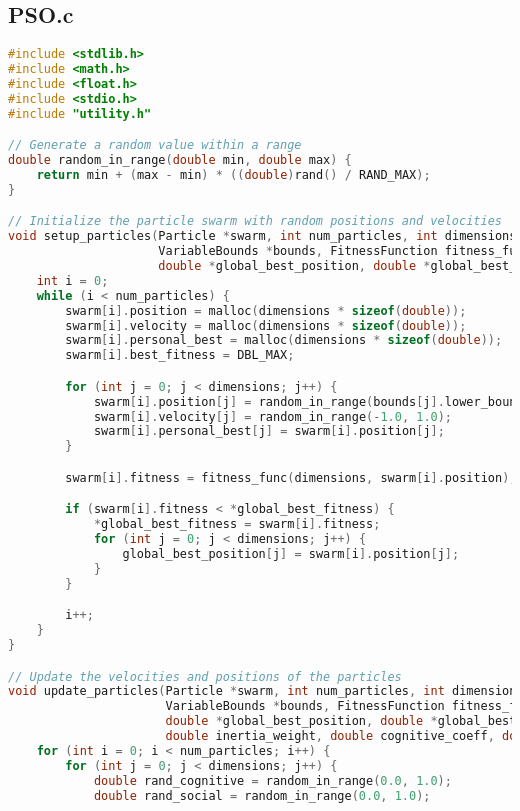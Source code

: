 \documentclass[12pt]{article}
\begin{document}
\subsection{PSO.c}
\begin{lstlisting}[language=C]
#include <stdlib.h>
#include <math.h>
#include <float.h>
#include <stdio.h>
#include "utility.h"

// Generate a random value within a range
double random_in_range(double min, double max) {
    return min + (max - min) * ((double)rand() / RAND_MAX);
}

// Initialize the particle swarm with random positions and velocities
void setup_particles(Particle *swarm, int num_particles, int dimensions,
                     VariableBounds *bounds, FitnessFunction fitness_func,
                     double *global_best_position, double *global_best_fitness) {
    int i = 0;
    while (i < num_particles) {
        swarm[i].position = malloc(dimensions * sizeof(double));
        swarm[i].velocity = malloc(dimensions * sizeof(double));
        swarm[i].personal_best = malloc(dimensions * sizeof(double));
        swarm[i].best_fitness = DBL_MAX;

        for (int j = 0; j < dimensions; j++) {
            swarm[i].position[j] = random_in_range(bounds[j].lower_bound, bounds[j].upper_bound);
            swarm[i].velocity[j] = random_in_range(-1.0, 1.0);
            swarm[i].personal_best[j] = swarm[i].position[j];
        }

        swarm[i].fitness = fitness_func(dimensions, swarm[i].position);

        if (swarm[i].fitness < *global_best_fitness) {
            *global_best_fitness = swarm[i].fitness;
            for (int j = 0; j < dimensions; j++) {
                global_best_position[j] = swarm[i].position[j];
            }
        }

        i++;
    }
}

// Update the velocities and positions of the particles
void update_particles(Particle *swarm, int num_particles, int dimensions,
                      VariableBounds *bounds, FitnessFunction fitness_func,
                      double *global_best_position, double *global_best_fitness,
                      double inertia_weight, double cognitive_coeff, double social_coeff) {
    for (int i = 0; i < num_particles; i++) {
        for (int j = 0; j < dimensions; j++) {
            double rand_cognitive = random_in_range(0.0, 1.0);
            double rand_social = random_in_range(0.0, 1.0);


\end{lstlisting}
\end{document}

